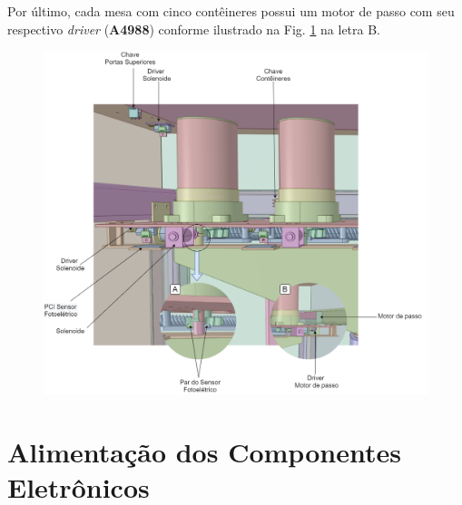     Por último, cada mesa com cinco contêineres possui um motor de passo com seu respectivo \textit{driver} (\textbf{A4988}) conforme ilustrado na Fig. \ref{fig:integracao_4} na letra B.
    
    \begin{figure}[H]
        \centering
        \includegraphics[width=\textwidth]{figuras/integracao/integracao_4.png} 
        \caption{}
        \label{fig:integracao_4}
    \end{figure}
    
    
\section{Alimentação dos Componentes Eletrônicos}
\label{alimentacao_componentes}

